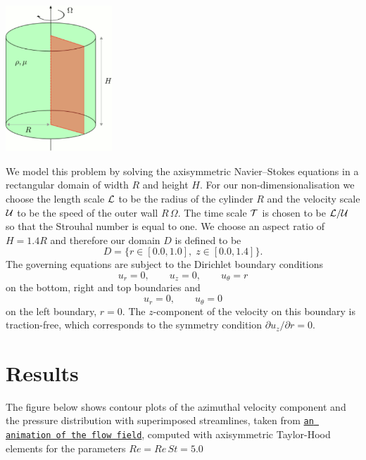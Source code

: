  
\begin{DoxyImage}
\includegraphics[width=0.3\textwidth]{spin_up_diagram}
\end{DoxyImage}


We model this problem by solving the axisymmetric Navier--Stokes equations in a rectangular domain of width $ R $ and height $ H $. For our non-\/dimensionalisation we choose the length scale $ {\cal L} $ to be the radius of the cylinder $ R $ and the velocity scale $ {\cal U} $ to be the speed of the outer wall $ R \, \Omega $. The time scale $ {\cal T} $ is chosen to be $ {\cal L}/{\cal U} $ so that the Strouhal number is equal to one. We choose an aspect ratio of $ H = 1.4 R $ and therefore our domain $ D $ is defined to be \[ D = \{ r \in [0.0,1.0], \; z \in [0.0,1.4] \}. \] The governing equations are subject to the Dirichlet boundary conditions \[ u_r = 0, \qquad u_z = 0, \qquad u_\theta = r \] on the bottom, right and top boundaries and \[ u_r = 0, \qquad u_\theta = 0 \] on the left boundary, $ r=0 $. The $ z $-\/component of the velocity on this boundary is traction-\/free, which corresponds to the symmetry condition $ \partial u_z /\partial r = 0 $.



 

\hypertarget{index_results}{}\section{Results}\label{index_results}
The figure below shows contour plots of the azimuthal velocity component and the pressure distribution with superimposed streamlines, taken from \href{../figures/spin_up_stream.avi}{\tt an animation of the flow field}, computed with axisymmetric Taylor-\/\+Hood elements for the parameters $ Re = Re \, St = 5.0 $

